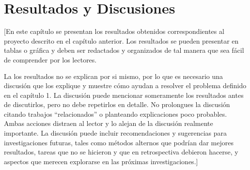 \chapter{Resultados y Discusiones}
[En este capítulo se presentan los resultados obtenidos correspondientes al proyecto descrito en el capítulo anterior. Los resultados se pueden presentar en tablas o gráfica y deben ser redactados y organizados de tal manera que sea fácil de comprender por los lectores.

La los resultados no se explican por si mismo, por lo que es necesario una discusión que los explique y muestre cómo ayudan a resolver el problema definido en el capítulo 1. La discusión puede mencionar someramente los resultados antes de discutirlos, pero no debe repetirlos en detalle. No prolongues la discusión citando trabajos ``relacionados'' o planteando explicaciones poco probables. Ambas acciones distraen al lector y lo alejan de la discusión realmente importante. La discusión puede incluir recomendaciones y sugerencias para investigaciones futuras, tales como métodos alternos que podrían dar mejores resultados, tareas que no se hicieron y que en retrospectiva debieron hacerse, y aspectos que merecen explorarse en las próximas investigaciones.]
